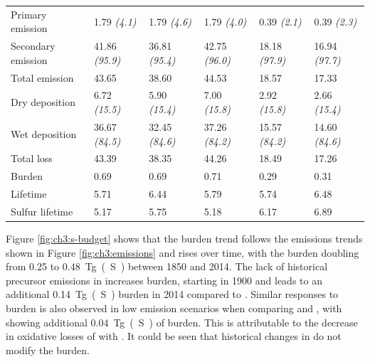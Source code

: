 \begin{table}[!ht]
\begin{tabular}{l p{14mm} p{14mm} p{14mm} p{14mm} p{14mm}}
Primary emission & 1.79 \textit{(4.1)} & 1.79 \textit{(4.6)} & 1.79 \textit{(4.0)} & 0.39 \textit{(2.1)} & 0.39 \textit{(2.3)} \\
Secondary emission & 41.86 \textit{(95.9)} & 36.81 \textit{(95.4)} & 42.75 \textit{(96.0)} & 18.18 \textit{(97.9)} & 16.94 \textit{(97.7)} \\
Total emission & 43.65 & 38.60 & 44.53 & 18.57 & 17.33 \\
Dry deposition & 6.72 \textit{(15.5)} & 5.90 \textit{(15.4)} & 7.00 \textit{(15.8)} & 2.92 \textit{(15.8)} & 2.66 \textit{(15.4)} \\
Wet deposition & 36.67 \textit{(84.5)} & 32.45 \textit{(84.6)} & 37.26 \textit{(84.2)} & 15.57 \textit{(84.2)} & 14.60 \textit{(84.6)} \\
Total loss & 43.39 & 38.35 & 44.26 & 18.49 & 17.26 \\
Burden & 0.69 & 0.69 & 0.71 & 0.29 & 0.31 \\
Lifetime & 5.71 & 6.44 & 5.79 & 5.74 & 6.48 \\
\midrule
Sulfur lifetime & 5.17 & 5.75 & 5.18 & 6.17 & 6.89 \\
\bottomrule

\end{tabular}
\end{table}


Figure \ref{fig:ch3:s-budget} shows that the  burden trend follows the  emissions trends shown in Figure \ref{fig:ch3:emissions} and rises over time, with the burden doubling from \num{0.25} to \qty{0.48}{Tg(S)} between 1850 and 2014. The lack of historical  precursor emissions in \sstpio{} increases  burden, starting in 1900 and leads to an additional \qty{0.14}{Tg(S)} burden in 2014 compared to \histsst{}. Similar responses to  burden is also observed in low  emission scenarios when comparing \sstpiaer{} and \sstpintcf{}, with \sstpintcf{} showing additional \qty{0.04}{Tg(S)} of  burden. This is attributable to the decrease in oxidative losses of  with . It could be seen that historical changes in  do not modify the  burden.

